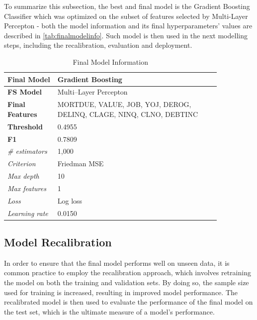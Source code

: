 To summarize this subsection, the best and final model is the Gradient Boosting Classifier which was optimized on the subset of features selected by Multi-Layer Percepton - both the model information and its final hyperparameters' values are described in \autoref{tab:finalmodelinfo}. Such model is then used in the next modelling steps, including the recalibration, evaluation and deployment.
\begin{table}[H]
    \small
    \setlength{\tabcolsep}{8pt}
    \renewcommand{\arraystretch}{1.3}
    \centering
    \caption{Final Model Information}\label{tab:finalmodelinfo}
    \begin{tabular}{>{\raggedleft\arraybackslash}p{0.20\linewidth}|p{0.65\linewidth}}
    \toprule
    \midrule
    \textbf{Final Model} & Gradient Boosting \\
    \midrule
    \textbf{FS Model} & Multi--Layer Percepton \\
    \midrule
    \textbf{Final Features} &
    MORTDUE, VALUE, JOB, YOJ, DEROG, DELINQ, CLAGE, NINQ, CLNO, DEBTINC \\
    \midrule
    \textbf{Threshold} & 0.4955 \\
    \midrule
    \textbf{F1} & 0.7809 \\
    \midrule
    \textit{\# estimators} & 1,000 \\
    \midrule
    \textit{Criterion} & Friedman MSE \\
    \midrule
    \textit{Max depth} & 10 \\
    \midrule
    \textit{Max features} & 1 \\
    \midrule
    \textit{Loss} & Log loss \\
    \midrule
    \textit{Learning rate} & 0.0150 \\
    \midrule
    \bottomrule
    \end{tabular}
    \vspace{0.5em}
    
    \vspace{-0.5em}
\end{table}

\subsection{Model Recalibration}

In order to ensure that the final model performs well on unseen data, it is common practice to employ the recalibration approach, which involves retraining the model on both the training and validation sets.
By doing so, the sample size used for training is increased, resulting in improved model performance.
The recalibrated model is then used to evaluate the performance of the final model on the test set, which is the ultimate measure of a model's performance.

